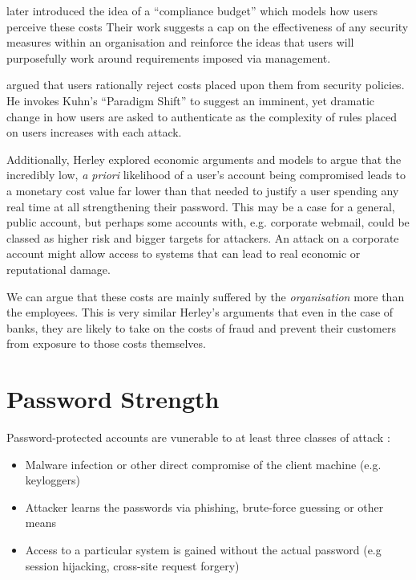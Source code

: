 \documentclass{report}
\begin{document}
\textcite{beautement2009compliance} later introduced the idea of a
``compliance budget'' which models how users perceive these costs
Their work suggests a cap on the effectiveness of any
security measures within an organisation and reinforce the ideas
that users will purposefully work around requirements imposed via
management.

\textcite{herley2009so} argued that users rationally reject costs
placed upon them from security policies. He invokes Kuhn's
``Paradigm Shift''\parencite{kuhn1962structure} to suggest
an imminent, yet dramatic change in
how users are asked to authenticate as the complexity of
rules placed on users increases with each attack.

Additionally, Herley explored economic arguments
and models
to argue that the incredibly low, \emph{a priori} likelihood
of a user's account being compromised leads to a monetary
cost value far lower than that needed to justify a user
spending any real time at all strengthening their password.
This may be a case for a general, public account, but perhaps
some accounts with, e.g. corporate webmail, could be classed
as higher risk and bigger targets for attackers. An attack
on a corporate account might allow access to systems that
can lead to real economic or reputational damage.

We can argue that these costs
are mainly suffered by the \emph{organisation}
more than the employees. This is very similar Herley's
arguments that even in the case of banks, they are likely
to take on the costs of fraud and prevent their customers
from exposure to those costs themselves.

\section{Password Strength}
\label{sec:strength}

Password-protected accounts are vunerable to at least three
classes of attack \parencite{florencio2014password}:

\begin{itemize}
  \item Malware infection or other direct compromise of the client machine (e.g. keyloggers)
  \item Attacker learns the passwords via phishing, brute-force guessing or other means
  \item Access to a particular system is gained without the actual password (e.g session hijacking, cross-site request forgery)
\end{itemize}
\end{document}
